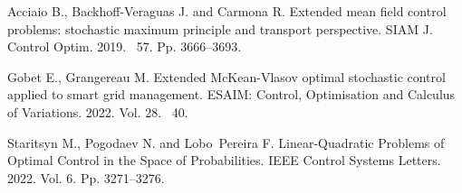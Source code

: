 \begin{thebibliography}{9} %

 Acciaio B., Backhoff-Veraguas J. and Carmona  R. Extended mean field control problems: stochastic maximum principle and transport perspective. SIAM J. Control Optim. 2019. \textnumero~57. Pp. 3666--3693.

 Gobet E., Grangereau M. Extended McKean-Vlasov optimal stochastic control applied
to smart grid management. ESAIM: Control, Optimisation and Calculus of Variations. 2022. Vol. 28. \textnumero~40.

 Staritsyn M., Pogodaev N. and Lobo~Pereira F. Linear-Quadratic Problems of Optimal Control in the Space of Probabilities. IEEE Control Systems Letters. 2022. Vol. 6. Pp. 3271--3276.






\end{thebibliography}





%

